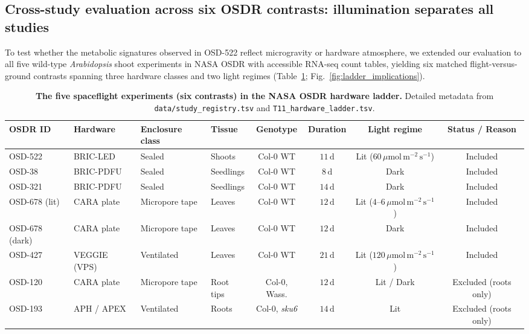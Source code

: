 \documentclass[10pt,twocolumn,a4paper]{article}
\newcommand{\ums}{\ensuremath{\mu\mathrm{mol\,m^{-2}\,s^{-1}}}}
\begin{document}
\subsection*{Cross-study evaluation across six OSDR contrasts: illumination separates all studies}\label{sec:ladder}

To test whether the metabolic signatures observed in OSD-522 reflect microgravity or hardware atmosphere, we extended our evaluation to all five wild-type \textit{Arabidopsis} shoot experiments in NASA OSDR with accessible RNA-seq count tables, yielding six matched flight-versus-ground contrasts spanning three hardware classes and two light regimes (Table~\ref{tab:osdr_ladder}; Fig.~\ref{fig:ladder_implications}).

\begin{table}[tbp]
\caption{\textbf{The five spaceflight experiments (six contrasts) in the NASA OSDR hardware ladder.}
Detailed metadata from \texttt{data/study\_registry.tsv} and \texttt{T11\_hardware\_ladder.tsv}.}
\label{tab:osdr_ladder}
\centering
\footnotesize
\begin{tabular*}{\textwidth}{@{\extracolsep{\fill}}llllcccc@{}}
\toprule
\textbf{OSDR ID} & \textbf{Hardware} & \textbf{Enclosure class} & \textbf{Tissue} & \textbf{Genotype} & \textbf{Duration} & \textbf{Light regime} & \textbf{Status / Reason} \\
\midrule
OSD-522 & BRIC-LED & Sealed & Shoots & Col-0 WT & $11\,\mathrm{d}$ & Lit ($60\,\ums$) & Included \\
OSD-38 & BRIC-PDFU & Sealed & Seedlings & Col-0 WT & $8\,\mathrm{d}$ & Dark & Included \\
OSD-321 & BRIC-PDFU & Sealed & Seedlings & Col-0 WT & $14\,\mathrm{d}$ & Dark & Included \\
OSD-678 (lit) & CARA plate & Micropore tape & Leaves & Col-0 WT & $12\,\mathrm{d}$ & Lit ($4\text{--}6\,\ums$) & Included \\
OSD-678 (dark) & CARA plate & Micropore tape & Leaves & Col-0 WT & $12\,\mathrm{d}$ & Dark & Included \\
OSD-427 & VEGGIE (VPS) & Ventilated & Leaves & Col-0 WT & $21\,\mathrm{d}$ & Lit ($120\,\ums$) & Included \\
\midrule
OSD-120 & CARA plate & Micropore tape & Root tips & Col-0, Wass. & $12\,\mathrm{d}$ & Lit / Dark & Excluded (roots only) \\
OSD-193 & APH / APEX & Ventilated & Roots & Col-0, \textit{sku6} & $14\,\mathrm{d}$ & Lit & Excluded (roots only) \\

\end{tabular*}
\end{table}
\end{document}
